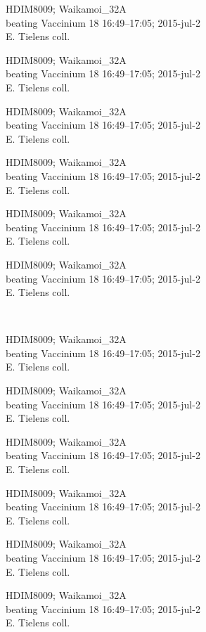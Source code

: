 \documentclass[2pt]{extarticle}
\begin{document}
\noindent
\parbox{0.16\textwidth}{\tiny \raggedright \rule[-0.3\baselineskip]{0pt}{10pt}HDIM8009; Waikamoi\_32A\\ beating Vaccinium 18 16:49--17:05; 2015-jul-2\\ E. Tielens coll.}
\parbox{0.16\textwidth}{\tiny \raggedright \rule[-0.3\baselineskip]{0pt}{10pt}HDIM8009; Waikamoi\_32A\\ beating Vaccinium 18 16:49--17:05; 2015-jul-2\\ E. Tielens coll.}
\parbox{0.16\textwidth}{\tiny \raggedright \rule[-0.3\baselineskip]{0pt}{10pt}HDIM8009; Waikamoi\_32A\\ beating Vaccinium 18 16:49--17:05; 2015-jul-2\\ E. Tielens coll.}
\parbox{0.16\textwidth}{\tiny \raggedright \rule[-0.3\baselineskip]{0pt}{10pt}HDIM8009; Waikamoi\_32A\\ beating Vaccinium 18 16:49--17:05; 2015-jul-2\\ E. Tielens coll.}
\parbox{0.16\textwidth}{\tiny \raggedright \rule[-0.3\baselineskip]{0pt}{10pt}HDIM8009; Waikamoi\_32A\\ beating Vaccinium 18 16:49--17:05; 2015-jul-2\\ E. Tielens coll.}
\parbox{0.16\textwidth}{\tiny \raggedright \rule[-0.3\baselineskip]{0pt}{10pt}HDIM8009; Waikamoi\_32A\\ beating Vaccinium 18 16:49--17:05; 2015-jul-2\\ E. Tielens coll.} \\ 
\vspace{0.001in} 

\noindent
\parbox{0.16\textwidth}{\tiny \raggedright \rule[-0.3\baselineskip]{0pt}{10pt}HDIM8009; Waikamoi\_32A\\ beating Vaccinium 18 16:49--17:05; 2015-jul-2\\ E. Tielens coll.}
\parbox{0.16\textwidth}{\tiny \raggedright \rule[-0.3\baselineskip]{0pt}{10pt}HDIM8009; Waikamoi\_32A\\ beating Vaccinium 18 16:49--17:05; 2015-jul-2\\ E. Tielens coll.}
\parbox{0.16\textwidth}{\tiny \raggedright \rule[-0.3\baselineskip]{0pt}{10pt}HDIM8009; Waikamoi\_32A\\ beating Vaccinium 18 16:49--17:05; 2015-jul-2\\ E. Tielens coll.}
\parbox{0.16\textwidth}{\tiny \raggedright \rule[-0.3\baselineskip]{0pt}{10pt}HDIM8009; Waikamoi\_32A\\ beating Vaccinium 18 16:49--17:05; 2015-jul-2\\ E. Tielens coll.}
\parbox{0.16\textwidth}{\tiny \raggedright \rule[-0.3\baselineskip]{0pt}{10pt}HDIM8009; Waikamoi\_32A\\ beating Vaccinium 18 16:49--17:05; 2015-jul-2\\ E. Tielens coll.}
\parbox{0.16\textwidth}{\tiny \raggedright \rule[-0.3\baselineskip]{0pt}{10pt}HDIM8009; Waikamoi\_32A\\ beating Vaccinium 18 16:49--17:05; 2015-jul-2\\ E. Tielens coll.} \\ 
\vspace{0.001in} 
\end{document}
